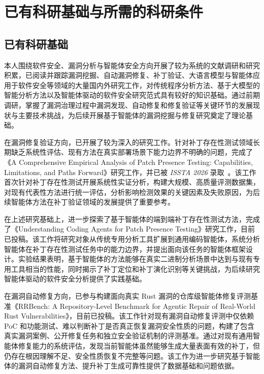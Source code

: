 \section{已有科研基础与所需的科研条件}

\subsection{已有科研基础}

本人围绕软件安全、漏洞分析与智能体安全方向开展了较为系统的文献调研和研究积累，已阅读并跟踪漏洞挖掘、自动漏洞修复、补丁验证、大语言模型与智能体应用于软件安全等领域的大量国内外研究工作，对传统程序分析方法、基于大模型的智能分析方法以及智能体驱动的软件安全研究范式具有较好的知识基础。通过前期调研，掌握了漏洞治理过程中漏洞发现、自动修复和修复验证等关键环节的发展现状与主要技术挑战，为后续开展基于智能体的漏洞挖掘与修复研究奠定了理论基础。

在漏洞修复验证方向，已开展了较为深入的研究工作。针对补丁存在性测试领域长期缺乏系统性评估、现有方法在真实部署场景下能力边界不明确的问题，完成了《A Comprehensive Empirical Analysis of Patch Presence Testing: Capabilities, Limitations, and Paths Forward》研究工作，并已被 \textit{ISSTA 2026} 录取~\cite{zhang2026pptempirical}。该工作首次针对补丁存在性测试开展系统性实证分析，构建大规模、高质量评测数据集，对现有代表性方法进行统一评估，分析影响检测效果的关键因素及失败原因，为后续智能体方法在补丁验证领域的发展提供了重要参考。

在上述研究基础上，进一步探索了基于智能体的端到端补丁存在性测试方法，完成了《Understanding Coding Agents for Patch Presence Testing》研究工作，目前已投稿。该工作将研究对象从传统专用分析工具扩展到通用编码智能体，系统分析智能体在补丁存在性测试任务中的能力边界，并提出面向该任务的智能体框架设计。实验结果表明，基于智能体的方法能够在真实二进制分析场景中达到与现有专用工具相当的性能，同时揭示了补丁定位和补丁演化识别等关键挑战，为后续研究智能体驱动的软件安全分析提供了实践基础。

在漏洞自动修复方向，已参与构建面向真实 Rust 漏洞的仓库级智能体修复评测基准《RRBench: A Repository-Level Benchmark for Agentic Repair of Real-World Rust Vulnerabilities》，目前已投稿。该工作针对现有漏洞自动修复评测中仅依赖 PoC 和功能测试、难以判断补丁是否真正恢复漏洞安全性质的问题，构建了包含真实漏洞案例、公开修复任务和独立安全验证机制的评测基准。通过对现有通用智能体修复能力的系统评估，发现当前智能体虽然能够生成大量表面有效的补丁，但仍存在根因理解不足、安全性质恢复不完整等问题。该工作为进一步研究基于智能体的漏洞自动修复方法、提升补丁生成可靠性提供了数据基础和问题依据。

